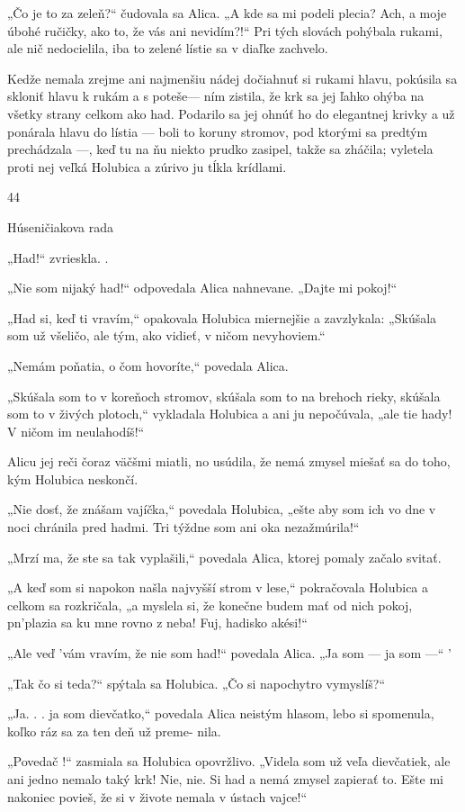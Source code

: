 \documentclass[12pt]{article}
\begin{document}
\begin{Parallel}[p]{}{}
{{„Čo je to za zeleň?“ čudovala sa Alica. „A kde sa mi
podeli plecia? Ach, a moje úbohé ručičky, ako to, že vás ani
nevidím?!“ Pri tých slovách pohýbala rukami, ale nič
nedocielila, iba to zelené lístie sa v diaľke zachvelo.

Kedže nemala zrejme ani najmenšiu nádej dočiahnuť si
rukami hlavu, pokúsila sa skloniť hlavu k rukám a s poteše—
ním zistila, že krk sa jej ľahko ohýba na všetky strany celkom
ako had. Podarilo sa jej ohnúť ho do elegantnej krivky a už
ponárala hlavu do lístia — boli to koruny stromov, pod
ktorými sa predtým prechádzala —, keď tu na ňu niekto
prudko zasipel, takže sa zháčila; vyletela proti nej veľká
Holubica a zúrivo ju tĺkla krídlami. \

44

Húseničiakova rada

„Had!“ zvrieskla. .

„Nie som nijaký had!“ odpovedala Alica nahnevane.
„Dajte mi pokoj!“

„Had si, keď ti vravím,“ opakovala Holubica miernejšie
a zavzlykala: „Skúšala som už všeličo, ale tým, ako vidieť,
v ničom nevyhoviem.“

„Nemám poňatia, o čom hovoríte,“ povedala Alica.

„Skúšala som to v koreňoch stromov, skúšala som to na
brehoch rieky, skúšala som to v živých plotoch,“ vykladala
Holubica a ani ju nepočúvala, „ale tie hady! V ničom im
neulahodíš!“

Alicu jej reči čoraz väčšmi miatli, no usúdila, že nemá
zmysel miešať sa do toho, kým Holubica neskončí.

„Nie dosť, že znášam vajíčka,“ povedala Holubica, „ešte
aby som ich vo dne v noci chránila pred hadmi. Tri týždne
som ani oka nezažmúrila!“

„Mrzí ma, že ste sa tak vyplašili,“ povedala Alica, ktorej
pomaly začalo svitať.

„A keď som si napokon našla najvyšší strom v lese,“
pokračovala Holubica a celkom sa rozkričala, „a myslela si,
že konečne budem mať od nich pokoj, pn'plazia sa ku mne
rovno z neba! Fuj, hadisko akési!“

„Ale veď 'vám vravím, že nie som had!“ povedala Alica.
„Ja som — ja som —“ '

„Tak čo si teda?“ spýtala sa Holubica. „Čo si napochytro
vymyslíš?“

„Ja. . . ja som dievčatko,“ povedala Alica neistým hlasom,
lebo si spomenula, koľko ráz sa za ten deň už preme-
nila.

„Povedač !“ zasmiala sa Holubica opovržlivo. „Videla
som už veľa dievčatiek, ale ani jedno nemalo taký krk! Nie,
nie. Si had a nemá zmysel zapierať to. Ešte mi nakoniec
povieš, že si v živote nemala v ústach vajce!“

}}
\end{Parallel}
\end{document}
